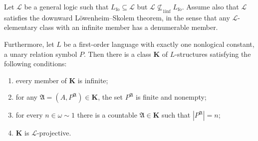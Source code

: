 Let $\mathscr{L}$ be a general logic such that $L_{\text{fo}} \subseteq \mathscr{L}$ but $\mathscr{L} \not\subseteq_{1\text{inf}} L_{\text{fo}}$. Assume also that $\mathscr{L}$ satisfies the downward Löwenheim–Skolem theorem, in the sense that any $\mathscr{L}$-elementary class with an infinite member has a denumerable member.

Furthermore, let $L$ be a first-order language with exactly one nonlogical constant, a unary relation symbol $P$. Then there is a class $\mathbf{K}$ of $L$-structures satisfying the following conditions:

\begin{enumerate}
\item[(i)] every member of $\mathbf{K}$ is infinite;
\item[(ii)] for any $\mathfrak{A} = (A, P^{\mathfrak{A}}) \in \mathbf{K}$, the set $P^{\mathfrak{A}}$ is finite and nonempty;
\item[(iii)] for every $n \in \omega \sim 1$ there is a countable $\mathfrak{A} \in \mathbf{K}$ such that $|P^{\mathfrak{A}}| = n$;
\item[(iv)] $\mathbf{K}$ is $\mathscr{L}$-projective.
\end{enumerate}
